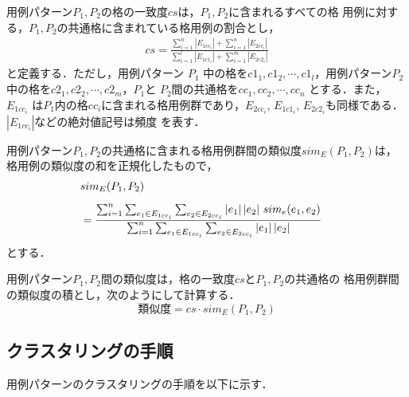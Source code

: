 用例パターン$P_1, P_2$の格の一致度$cs$は，$P_1, P_2$に含まれるすべての格
用例に対する，$P_1, P_2$の共通格に含まれている格用例の割合とし，
\begin{eqnarray*}
 cs = \frac{\sum_{i = 1}^{n}|E_{1cc_i}|+\sum_{i = 1}^{n}|E_{2cc_i}|}{\sum_{i = 1}^{l}|E_{1c1_i}|+\sum_{i = 1}^{m}|E_{2c2_i}|}
\end{eqnarray*}
と定義する．ただし，用例パターン $P_1$ 中の格を$c1_1, c1_2, \cdots,
c1_l$，用例パターン$P_2$中の格を$c2_1, c2_2, \cdots, c2_m$，$P_1$と 
$P_2$間の共通格を$cc_1, cc_2, \cdots, cc_n$ とする．また，$E_{1cc_i}$
は$P_1$内の格$cc_i$に含まれる格用例群であり，$E_{2cc_i}$, $E_{1c1_i}$,
$E_{2c2_i}$も同様である．$\left|E_{1cc_i}\right|$などの絶対値記号は頻度
を表す．

用例パターン$P_1, P_2$の共通格に含まれる格用例群間の類似度$sim_E(P_1,
P_2)$は，格用例の類似度の和を正規化したもので，
\begin{eqnarray*}
 \lefteqn{sim_E(P_1, P_2)}\\[5pt]
 & = \frac{\sum_{i = 1}^{n} \sum_{e_1 \in E_{1cc_i}}\sum_{e_2 \in E_{2cc_i}} \left|e_1\right| \left|e_2\right| \, sim_e(e_1, e_2)}{\sum_{i = 1}^{n} \sum_{e_1 \in E_{1cc_i}}\sum_{e_2 \in E_{2cc_i}} \left|e_1\right| \left|e_2\right|}
\end{eqnarray*}
とする．

用例パターン$P_1, P_2$間の類似度は，格の一致度$cs$と$P_1, P_2$の共通格の
格用例群間の類似度の積とし，次のようにして計算する．
\[
 \mbox{類似度} = cs \cdot sim_E(P_1, P_2)
\]


\subsection{クラスタリングの手順}

用例パターンのクラスタリングの手順を以下に示す．

